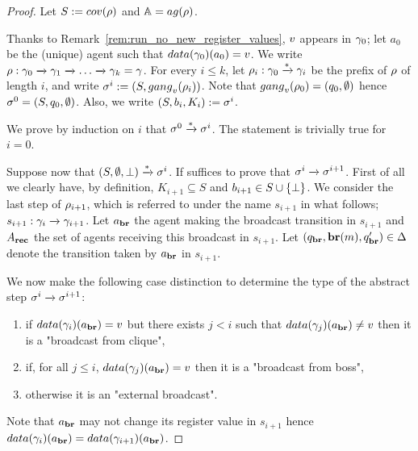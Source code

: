 \begin{proof}
	Let $\covset := \statesin{\run}$ and $\agents = \agentsof{\run}$.
	
	Thanks to Remark~\ref{rem:run_no_new_register_values},  $v$ appears in $\gamma_0$; let $a_0$ be the (unique) agent such that $\data{\config_0}(a_0) = \aval$. We write $\rho : \gamma_0 \xrightarrow{} \gamma_1 \xrightarrow{} \dots \xrightarrow{} \gamma_k = \gamma$. For every $i \leq k$, let $\rho_i : \gamma_0 \xrightarrow{*} \gamma_i$ be the prefix of $\rho$ of length $i$, and write $\aconfig^i := (\covset, \gangof{\aval}{\run_i})$. Note that $\gangof{\aval}{\run_0} = (q_0, \emptyset)$ hence $\sigma^0 = (S, q_0, \emptyset)$. Also, we write $(\covset, \boss_i, \clique_i) := \aconfig^i$.
	
	We prove by induction on $i$ that $\sigma^0 \xrightarrow{*} \sigma^i$.
	The statement is trivially true for $i =0$. 
	
	Suppose now that $(S, \emptyset, \bot) \xrightarrow{*} \sigma^i$. 
	If suffices to prove that $\sigma^i \xrightarrow{} \sigma^{i+1}$. First of all we clearly have, by definition, $K_{i+1} \subseteq S$ and $\boss_{i+1}\in S\cup\set{\noboss}$. We consider the last step of $\rho_{i+1}$, which is referred to under the name $s_{i+1}$ in what follows; $s_{i+1}: \gamma_i \xrightarrow{} \gamma_{i+1}$. Let $a_{\textbf{br}}$ the agent making the broadcast transition in $s_{i+1}$ and $A_{\textbf{rec}}$ the set of agents receiving this broadcast in $s_{i+1}$. Let $(q_{\textbf{br}}, \textbf{br}(m), q_{\textbf{br}}') \in \Delta$ denote the transition taken by $a_{\textbf{br}}$ in $s_{i+1}$.
	
	We now make the following case distinction to determine the type of the abstract step $\sigma^i \xrightarrow{} \sigma^{i+1}$:
	\begin{enumerate}
		\item\label{proof_completeness:case_broadcast_clique} if $\data{\config_{i}}(\agentbr) = \aval$ but there exists $j<i$ such that $\data{\config_{j}}(\agentbr) \ne \aval$ then it is a "broadcast from clique",
		\item\label{proof_completeness:case_broadcast_boss} if, for all $j \leq i$, $\data{\config_j}(\agentbr) = \aval$ then it is a "broadcast from boss",
		\item\label{proof_completeness:case_external_broadcast} otherwise it is an "external broadcast". 
	\end{enumerate}
	Note that $a_{\textbf{br}}$ may not change its register value in $s_{i+1}$ hence $\data{\config_i}(\agentbr) = \data{\config_{i+1}}(\agentbr)$. 
	

\end{proof}

